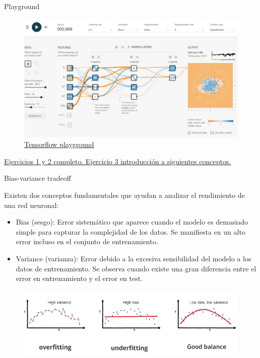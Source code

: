 \begin{frame}{Playground}
\begin{figure}
    \centering
    \includegraphics[width=\textwidth]{Slides/figures/Tema 3/Playground.png}
    \caption{\href{https://playground.tensorflow.org/}{Tensorflow playground}}
\end{figure}
\href{https://colab.research.google.com/github/guillermoih/M-todos-Generativos/blob/main/Notebooks/1.1_01-Playground.ipynb}{Ejercicios 1 y 2 completo. Ejercicio 3 introducción a siguientes conceptos.}
\end{frame}


\begin{frame}{Bias-variance tradeoff}


Existen dos \alert{conceptos fundamentales} que ayudan a analizar el rendimiento de una red neuronal:
\begin{itemize}
    \item \alert{Bias (sesgo)}: Error sistemático que aparece cuando el modelo es demasiado simple para capturar la complejidad de los datos. Se manifiesta en un alto error incluso en el conjunto de \alert{entrenamiento}.
    \item \alert{Variance (varianza)}: Error debido a la excesiva sensibilidad del modelo a los datos de entrenamiento. Se observa cuando existe una gran diferencia entre el error en \alert{entrenamiento} y el error en \alert{test}.
\end{itemize}

\begin{figure}
\centering
    \includegraphics[width=\textwidth]{Slides/figures/Tema 3/BiasVariance_1.jpg}
    \caption{\cite{BiasVariance_1}}
\end{figure}
\end{frame}

